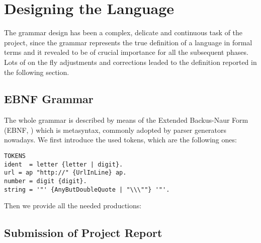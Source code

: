 \chapter{\label{chapter2} Designing the Language}

The grammar design has been a complex, delicate and continuous task of the project, since the grammar represents the true definition of a language in formal terms and it revealed to be of crucial importance for all the subsequent phases. Lots of on the fly adjustments and corrections leaded to the definition reported in the following section.

\section{EBNF Grammar}

The whole grammar is described by means of the Extended Backus-Naur Form (EBNF, \cite{ebnf}) which is metasyntax, commonly adopted by parser generators nowadays. We first introduce the used tokens, which are the following ones:

\begin{lstlisting}
TOKENS
ident  = letter {letter | digit}.
url = ap "http://" {UrlInLine} ap.
number = digit {digit}.
string = '"' {AnyButDoubleQuote | "\\\""} '"'.
\end{lstlisting}

Then we provide all the needed productions:

\section{Submission of Project Report}